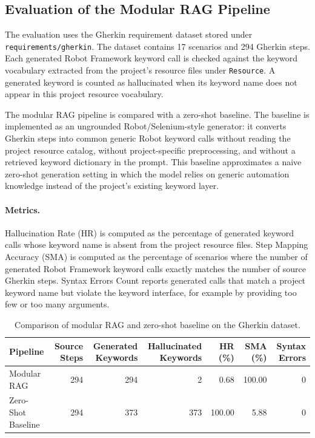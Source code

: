 
\subsection{Evaluation of the Modular RAG Pipeline}

The evaluation uses the Gherkin requirement dataset stored under
\texttt{requirements/gherkin}. The dataset contains 17 scenarios and 294
Gherkin steps. Each generated Robot Framework keyword call is checked against
the keyword vocabulary extracted from the project's resource files under
\texttt{Resource}. A generated keyword is counted as hallucinated when its
keyword name does not appear in this project resource vocabulary.

The modular RAG pipeline is compared with a zero-shot baseline. The baseline is
implemented as an ungrounded Robot/Selenium-style generator: it converts Gherkin
steps into common generic Robot keyword calls without reading the project
resource catalog, without project-specific preprocessing, and without a
retrieved keyword dictionary in the prompt. This baseline approximates a naive
zero-shot generation setting in which the model relies on generic automation
knowledge instead of the project's existing keyword layer.

\paragraph{Metrics.}
Hallucination Rate (HR) is computed as the percentage of generated keyword calls
whose keyword name is absent from the project resource files. Step Mapping
Accuracy (SMA) is computed as the percentage of scenarios where the number of
generated Robot Framework keyword calls exactly matches the number of source
Gherkin steps. Syntax Errors Count reports generated calls that match a project
keyword name but violate the keyword interface, for example by providing too few
or too many arguments.

\begin{table}[htbp]
\centering
\caption{Comparison of modular RAG and zero-shot baseline on the Gherkin dataset.}
\label{tab:rag_pipeline_evaluation}
\begin{tabular}{lrrrrrr}
\toprule
Pipeline & Source Steps & Generated Keywords & Hallucinated Keywords & HR (\%) & SMA (\%) & Syntax Errors \\
\midrule
Modular RAG & 294 & 294 & 2 & 0.68 & 100.00 & 0 \\
Zero-Shot Baseline & 294 & 373 & 373 & 100.00 & 5.88 & 0 \\
\bottomrule
\end{tabular}
\end{table}

